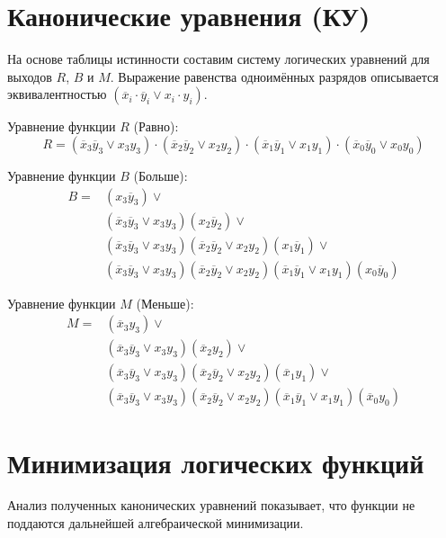 \documentclass[oneside,a4paper,14pt]{extarticle}
\begin{document}
\section{Канонические уравнения (КУ)}
На основе таблицы истинности составим систему логических уравнений для выходов $R$, $B$ и $M$. Выражение равенства одноимённых разрядов описывается эквивалентностью $(\overline{x}_i \cdot \overline{y}_i \vee x_i \cdot y_i)$.

Уравнение функции $R$ (Равно):
\begin{equation}
  R = (\overline{x}_3\overline{y}_3 \vee x_3y_3) \cdot (\overline{x}_2\overline{y}_2 \vee x_2y_2) \cdot (\overline{x}_1\overline{y}_1 \vee x_1y_1) \cdot (\overline{x}_0\overline{y}_0 \vee x_0y_0)
\end{equation}

Уравнение функции $B$ (Больше):
\begin{align*}
  B = {} & (x_3\overline{y}_3) \vee \\
         & (\overline{x}_3\overline{y}_3 \vee x_3y_3)(x_2\overline{y}_2) \vee \\
         & (\overline{x}_3\overline{y}_3 \vee x_3y_3)(\overline{x}_2\overline{y}_2 \vee x_2y_2)(x_1\overline{y}_1) \vee \\
         & (\overline{x}_3\overline{y}_3 \vee x_3y_3)(\overline{x}_2\overline{y}_2 \vee x_2y_2)(\overline{x}_1\overline{y}_1 \vee x_1y_1)(x_0\overline{y}_0)
\end{align*}

Уравнение функции $M$ (Меньше):
\begin{align*}
  M = {} & (\overline{x}_3y_3) \vee \\
         & (\overline{x}_3\overline{y}_3 \vee x_3y_3)(\overline{x}_2y_2) \vee \\
         & (\overline{x}_3\overline{y}_3 \vee x_3y_3)(\overline{x}_2\overline{y}_2 \vee x_2y_2)(\overline{x}_1y_1) \vee \\
         & (\overline{x}_3\overline{y}_3 \vee x_3y_3)(\overline{x}_2\overline{y}_2 \vee x_2y_2)(\overline{x}_1\overline{y}_1 \vee x_1y_1)(\overline{x}_0y_0)
\end{align*}

\section{Минимизация логических функций}
Анализ полученных канонических уравнений показывает, что функции не поддаются дальнейшей алгебраической минимизации. 
\end{document}
